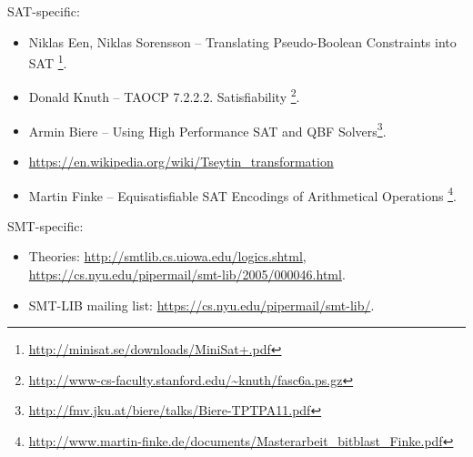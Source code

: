 SAT-specific:

\begin{itemize}

\item Niklas Een, Niklas Sorensson -- Translating Pseudo-Boolean Constraints into SAT
\footnote{\url{http://minisat.se/downloads/MiniSat+.pdf}}.

\item Donald Knuth -- \ac{TAOCP} 7.2.2.2. Satisfiability
\footnote{\url{http://www-cs-faculty.stanford.edu/~knuth/fasc6a.ps.gz}}.

\item Armin Biere -- Using High Performance SAT and QBF Solvers\footnote{\url{http://fmv.jku.at/biere/talks/Biere-TPTPA11.pdf}}.

\item \url{https://en.wikipedia.org/wiki/Tseytin_transformation}

\item Martin Finke -- Equisatisfiable SAT Encodings of Arithmetical Operations
\footnote{\url{http://www.martin-finke.de/documents/Masterarbeit_bitblast_Finke.pdf}}.

\end{itemize}

SMT-specific:

\begin{itemize}

\item Theories: \url{http://smtlib.cs.uiowa.edu/logics.shtml}, \url{https://cs.nyu.edu/pipermail/smt-lib/2005/000046.html}.

\item SMT-LIB mailing list: \url{https://cs.nyu.edu/pipermail/smt-lib/}.

\end{itemize}

